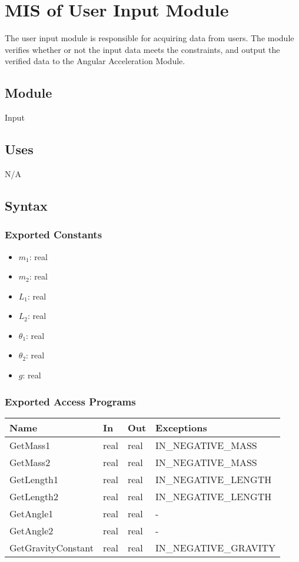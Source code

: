 \documentclass[12pt, titlepage]{article}
\begin{document}
\newpage

\section{MIS of User Input Module} \label{UIModule} 
The user input module is responsible for acquiring data from users. The module verifies whether or not the input data meets the constraints, and output the verified data to the Angular Acceleration Module.

\subsection{Module}

Input

\subsection{Uses}
N/A

\subsection{Syntax}

\subsubsection{Exported Constants}

\begin{itemize}
  \item $m_1$: real
  \item $m_2$: real
  \item $L_1$: real
  \item $L_2$: real
  \item $\theta_1$: real
  \item $\theta_2$: real
  \item $g$: real
\end{itemize}

\subsubsection{Exported Access Programs}

\begin{center}
\begin{tabular}{p{4cm} p{2cm} p{2cm} p{6cm}}
\hline
\textbf{Name} & \textbf{In} & \textbf{Out} & \textbf{Exceptions} \\
\hline
GetMass1 & real & real & IN\_NEGATIVE\_MASS \\
\hline
GetMass2 & real & real & IN\_NEGATIVE\_MASS \\
\hline
GetLength1 & real & real & IN\_NEGATIVE\_LENGTH \\
\hline
GetLength2 & real & real & IN\_NEGATIVE\_LENGTH \\
\hline
GetAngle1 & real & real & -\\
\hline
GetAngle2 & real & real & - \\
\hline
GetGravityConstant & real & real & IN\_NEGATIVE\_GRAVITY \\
\hline
\end{tabular}
\end{center}
\end{document}
